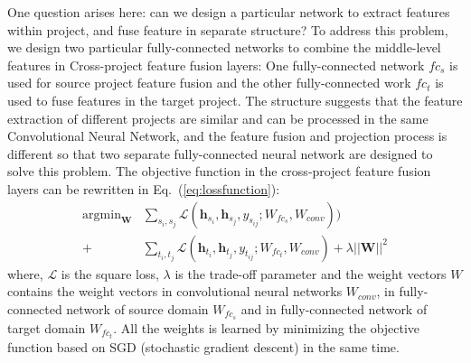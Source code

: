 One question arises here: can we design a particular network to extract features within project, and fuse feature in separate structure? To address this problem, we design two particular fully-connected networks to combine the middle-level features in Cross-project feature fusion layers: One fully-connected network $fc_s$ is used for source project feature fusion and the other fully-connected work $fc_t$ is used to fuse features in the target project. The structure suggests that the feature extraction of different projects are similar and can be processed in the same Convolutional Neural Network, and the feature fusion and projection process is different so that two separate fully-connected neural network are designed to solve this problem. The objective function in the cross-project feature fusion layers can be rewritten in Eq.~(\ref{eq:lossfunction}):
\begin{equation}
\begin{aligned}
\label{eq:lossfunction}
\mathop{\arg\min}_{\mathbf{W}}&\sum_{s_i,s_j}\mathcal{L}(\mathbf{h}_{s_i},\mathbf{h}_{s_j}
,y_{s_{ij}}; W_{fc_s}, W_{conv} ))\\
+&\sum_{t_i,t_j}\mathcal{L}(\mathbf{h}_{t_i},\mathbf{h}_{t_j},y_{t_{ij}}; W_{fc_t}, W_{conv})+\lambda||\mathbf{W}||^2
\end{aligned}
\end{equation}
where, $\mathcal{L}$ is the square loss, $\lambda$ is the trade-off parameter and the weight vectors $W$ contains the weight vectors in convolutional neural networks $W_{conv}$, in fully-connected network of source domain $W_{fc_s}$ and in fully-connected network of target domain $W_{fc_t}$. All the weights is learned by minimizing the objective function based on SGD (stochastic gradient descent) in the same time.



